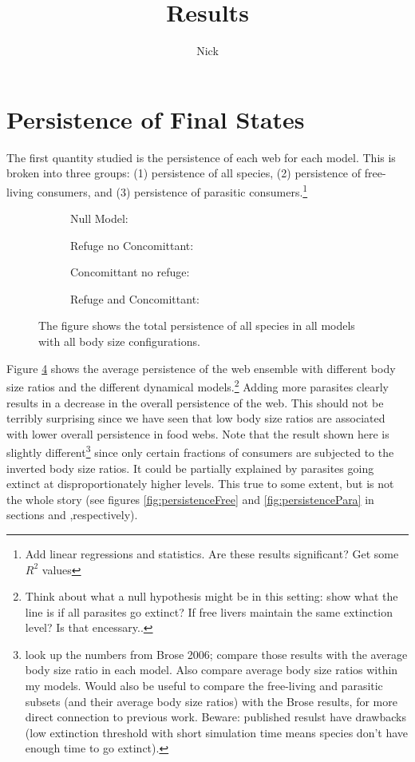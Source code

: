 \documentclass[11pt]{amsart}
\title{Results}
\author{Nick}
\begin{document}
\section{Persistence of Final States}
The first quantity studied is the persistence of each web for each model.  This is broken into three groups: (1) persistence of all species, (2) persistence of free-living consumers, and (3) persistence of parasitic consumers.\footnote{Add linear regressions and statistics.  Are these results significant?  Get some $R^2$ values}
\begin{figure}[h]
\begin{subfigure}[t]{.45\textwidth}
\caption{Null Model:\label{fig:persistenceAlla}}
\end{subfigure}
\begin{subfigure}[t]{.45\textwidth\label{fig:persistenceAllb}}
\caption{Refuge no Concomittant:}
\end{subfigure} 
\begin{subfigure}[ct]{.45\textwidth}
\caption{Concomittant no refuge:\label{fig:persistenceAllc}}
\end{subfigure}
\begin{subfigure}[ct]{.45\textwidth}
\caption{Refuge and Concomittant:\label{fig:persistenceAlld}}
\end{subfigure}
\caption{The figure shows the total persistence of all species in all models with all body size configurations.}
\label{fig:persistenceAll}
\end{figure}

Figure \ref{fig:persistenceAll} shows the average persistence of the web ensemble with different body size ratios and the different dynamical models.\footnote{Think about what a null hypothesis might be in this setting: show what the line is if all parasites go extinct?  If free livers maintain the same extinction level?  Is that encessary..} 
Adding more parasites clearly results in a decrease in the overall persistence of the web.  
This should not be terribly surprising since we have seen that low body size ratios are associated with lower overall persistence in food webs.  
Note that the result shown here is slightly different\footnote{look up the numbers from Brose 2006; compare those results with the average body size ratio in each model.  
Also compare average body size ratios within my models.  
Would also be useful to compare the free-living and parasitic subsets (and their average body size ratios) with the Brose results, for more direct connection to previous work.  Beware: published resulst have drawbacks (low extinction threshold with short simulation time means species don't have enough time to go extinct).} 
since only certain fractions of consumers are subjected to the inverted body size ratios. 
It could be partially explained by parasites going extinct at disproportionately higher levels.  This true to some extent, but is not the whole story (see figures \ref{fig:persistenceFree} and \ref{fig:persistencePara} in sections  and ,respectively).
\end{document}
